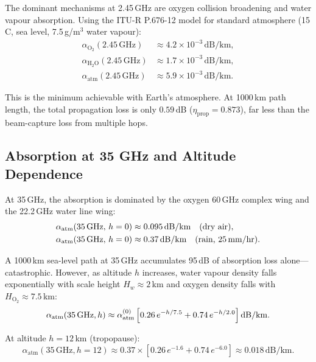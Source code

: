 \documentclass[aps,prd,twocolumn,superscriptaddress]{revtex4-2}
\newcommand{\alphaatm}{\alpha_\mathrm{atm}}
\begin{document}
The dominant mechanisms at 2.45\,GHz are oxygen collision broadening
and water vapour absorption.  Using the ITU-R P.676-12 model for
standard atmosphere (15\,\textdegree{}C, sea level, 7.5\,g/m$^3$
water vapour):
\begin{align}
\alpha_\mathrm{O_2}(2.45\,\mathrm{GHz}) &\approx 4.2\times10^{-3}\,\mathrm{dB/km},
\label{eq:alpha_O2}\\
\alpha_\mathrm{H_2O}(2.45\,\mathrm{GHz}) &\approx 1.7\times10^{-3}\,\mathrm{dB/km},
\label{eq:alpha_H2O}\\
\alphaatm(2.45\,\mathrm{GHz}) &\approx 5.9\times10^{-3}\,\mathrm{dB/km}.
\label{eq:alpha_total_245}
\end{align}

This is the minimum achievable with Earth's atmosphere.  At 1000\,km
path length, the total propagation loss is only
$0.59$\,dB ($\eta_\mathrm{prop} = 0.873$), far less than
the beam-capture loss from multiple hops.

\subsection{Absorption at 35 GHz and Altitude Dependence}

At 35\,GHz, the absorption is dominated by the oxygen 60\,GHz complex
wing and the 22.2\,GHz water line wing:
\begin{align}
\alphaatm(35\,\mathrm{GHz},\,h=0) &\approx 0.095\,\mathrm{dB/km}
\quad\text{(dry air)},\\
\alphaatm(35\,\mathrm{GHz},\,h=0) &\approx 0.37\,\mathrm{dB/km}
\quad\text{(rain, 25\,mm/hr)}.
\end{align}

A 1000\,km sea-level path at 35\,GHz accumulates 95\,dB of absorption
loss alone---catastrophic.  However, as altitude $h$ increases, water
vapour density falls exponentially with scale height $H_w \approx 2$\,km
and oxygen density falls with $H_\mathrm{O_2} \approx 7.5$\,km:
\begin{equation}
\alphaatm(35\,\mathrm{GHz},h)
\approx \alphaatm^{(0)}\,\Bigl[0.26\,e^{-h/7.5} + 0.74\,e^{-h/2.0}\Bigr]
\,\mathrm{dB/km}.
\label{eq:alpha_altitude}
\end{equation}

At altitude $h = 12$\,km (tropopause):
\begin{equation}
\alphaatm(35\,\mathrm{GHz},h=12) \approx 0.37\times[0.26\,e^{-1.6}+0.74\,e^{-6.0}]
\approx 0.018\,\mathrm{dB/km}.
\label{eq:alpha_12km}
\end{equation}
\end{document}
